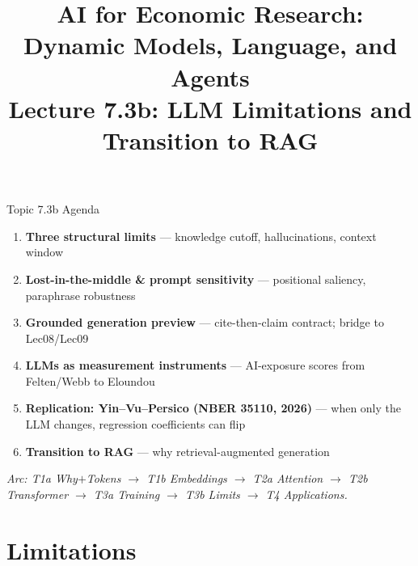 


\usetikzlibrary{arrows.meta, positioning, shapes.geometric, fit, backgrounds}

\graphicspath{{./pic/}{../../MiniCourse_8hr/Slides/Module3_LLM_Text/pic/}{../}}

\title[AI for Econ Research]{AI for Economic Research: Dynamic Models, Language, and Agents\\
Lecture 7.3b: LLM Limitations and Transition to RAG}



\makebeamertitle

\begin{frame}{Topic 7.3b Agenda}
\begin{enumerate}
  \item \textbf{Three structural limits} --- knowledge cutoff, hallucinations, context window
  \medskip
  \item \textbf{Lost-in-the-middle \& prompt sensitivity} --- positional saliency, paraphrase robustness
  \medskip
  \item \textbf{Grounded generation preview} --- cite-then-claim contract; bridge to Lec08/Lec09
  \medskip
  \item \textbf{LLMs as measurement instruments} --- AI-exposure scores from Felten/Webb to Eloundou
  \medskip
  \item \textbf{Replication: Yin--Vu--Persico (NBER 35110, 2026)} --- when only the LLM changes, regression coefficients can flip
  \medskip
  \item \textbf{Transition to RAG} --- why retrieval-augmented generation
\end{enumerate}

\bigskip
\footnotesize\textit{Arc: T1a Why$+$Tokens $\to$ T1b Embeddings $\to$ T2a Attention $\to$ T2b Transformer $\to$ T3a Training $\to$ T3b Limits $\to$ T4 Applications.}
\end{frame}

\section{Limitations}


